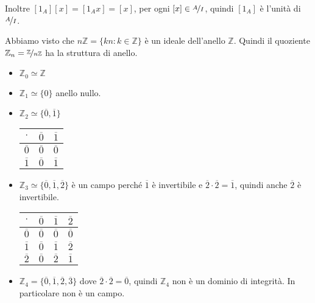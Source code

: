 \documentclass[../main.tex]{subfiles}
\begin{document}
Inoltre $[1_A] [x] = [1_A x] = [x] $, per ogni $[x] \in \nicefrac{A}{I}$, quindi $[1_A]$ è l'unità di $\nicefrac{A}{I}$.
\begin{example}
    Abbiamo visto che $n \mathbb{Z} = \{kn : k \in \mathbb{Z} \}$ è un ideale
    dell'anello $\mathbb{Z} $. Quindi il quoziente $\mathbb{Z}_n = \nicefrac{\mathbb{Z}}{n \mathbb{Z} }$ ha la struttura di anello.
    \begin{itemize}
        \item $\mathbb{Z}_0 \simeq \mathbb{Z} $
        \item $\mathbb{Z}_1 \simeq \{0\}$ anello nullo.
        \item $\mathbb{Z}_2 \simeq \{\overline{0}, \overline{1}\}$
              \begin{center}
                  \begin{tabular}{ c | c | c}
                      $\cdot$        & $\overline{0}$ & $\overline{1}$ \\ \hline
                      $\overline{0}$ & $\overline{0}$ & $\overline{0}$ \\ \hline
                      $\overline{1}$ & $\overline{0}$ & $\overline{1}$
                  \end{tabular}
              \end{center}
        \item $\mathbb{Z}_3 \simeq \{\overline{0}, \overline{1}, \overline{2}\}$ è un campo perché $\overline{1}$ è invertibile e $\overline{2} \cdot \overline{2} = \overline{1}$, quindi anche $\overline{2}$ è invertibile.
              \begin{center}
                  \begin{tabular}{ c | c | c | c}
                      $\cdot$        & $\overline{0}$ & $\overline{1}$ & $\overline{2}$ \\ \hline
                      $\overline{0}$ & $\overline{0}$ & $\overline{0}$ & $\overline{0}$ \\ \hline
                      $\overline{1}$ & $\overline{0}$ & $\overline{1}$ & $\overline{2}$ \\ \hline
                      $\overline{2}$ & $\overline{0}$ & $\overline{2}$ & $\overline{1}$
                  \end{tabular}
              \end{center}
        \item $\mathbb{Z}_4 = \{\overline{0},\overline{1},\overline{2},\overline{3}\}$ dove $\overline{2} \cdot \overline{2} = \overline{0}$, quindi $\mathbb{Z}_4$ non è un dominio di integrità. In particolare non è un campo.

\end{itemize}
\end{example}
\end{document}
